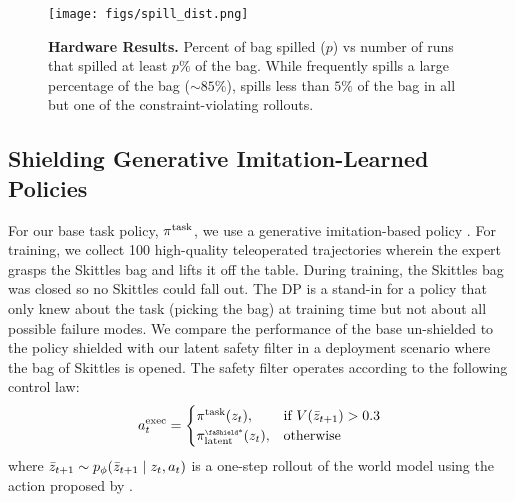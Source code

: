 \begin{figure}[t!]
    \centering
    \texttt{[image: figs/spill\_dist.png]}
    \caption{\textbf{Hardware Results.} %
    Percent of bag spilled ($p$) vs number of runs that spilled at least $p\%$ of the bag.
    While \diffpolicy frequently spills a large percentage of the bag ($\sim 85\%$), \ours spills less than $5\%$ of the bag in all but one of the constraint-violating rollouts. }
    \label{fig:hardware-hist}
    \vspace{-0.5cm}
\end{figure}



\subsection{Shielding Generative Imitation-Learned Policies}
\label{subsec:diffusion}

 For our base task policy, $\pi^{\text{task}}$, we use a generative imitation-based policy \diffpolicy \cite{chi2024diffusionpolicy}. 
For training, we collect 100 high-quality teleoperated trajectories wherein the expert grasps the Skittles bag and lifts it off the table. 
During training, the Skittles bag was closed so no Skittles could fall out. The DP is a stand-in for a policy that only knew about the task (picking the bag) at training time but not about all possible failure modes. 
We compare the performance of the base un-shielded \diffpolicy to the policy shielded with our latent safety filter in a deployment scenario where the bag of Skittles is opened. The safety filter operates according to the following control law:
\begin{align}
    \action^\text{exec}_{t} = 
    \begin{cases}
    \policyTask(\latent_t) ,& \text{if } \valfunc(\bar{\latent}_{t+1}) > 0.3\\
    \fallbackLatent(\latent_t),              & \textrm{otherwise}  \\ 
    \end{cases}
\end{align}
where $\bar{z}_{t+1} \sim p_\phi(\bar{z}_{t+1} \mid z_t, a_t)$ is a one-step rollout of the world model using the action proposed by \diffpolicy.

